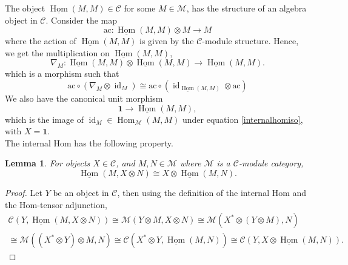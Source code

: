 \documentclass[a4paper, 10pt]{book}
\newtheorem{Lem}[theorem]{Lemma}
\theoremstyle{definition}
\numberwithin{equation}{chapter}
\newcommand\ac{\text{ac}}
\newcommand\id{\operatorname{id}}
\newcommand\ot{\otimes}
\newcommand\Hom{\operatorname{Hom}}
\newcommand\M{\mathcal{M}}
\newcommand\C{\mathcal C}
\newcommand\one{\mathbf{1}}
\begin{document}
The object $\underline{\Hom} (M, M)\in \C$ for some $M\in\M$, has the structure of an algebra object in $\C$. Consider the map \begin{equation}
	\ac: \underline{\Hom} (M, M) \otimes M \rightarrow M
\end{equation} where the action of $\underline{\Hom} (M, M)$ is given by the $\C$-module structure. Hence, we get the multiplication on $\underline{\Hom} (M, M)$,   \begin{equation}
\nabla_M:	\underline{\Hom} (M, M)\otimes \underline{\Hom} (M, M) \rightarrow \underline{\Hom} (M, M).
\end{equation} which is a morphism such that \begin{equation}
	\ac\circ (\nabla_M\ot \id_M) \cong \ac\circ (\id_{\underline{\Hom} (M, M)}\ot \ac)
\end{equation}  We also have the canonical unit morphism \begin{equation}
	\one\rightarrow \underline{\Hom}(M,M),                                                  
\end{equation}which is the image of $\id_M\in \Hom_\M(M, M)$ under equation \ref{internalhomiso}, with $X=\one$. 
\\
The internal Hom has the following property.
\begin{Lem}\label{internalhomlemma}
For objects $X\in \C$, and $ M, N\in \M$ where $\M$ is a $\C$-module category,
\begin{equation}
\underline{\Hom}(M, X\otimes N) \cong X \otimes \underline{\Hom}(M, N).
\end{equation}
\end{Lem}
\begin{proof}
Let $Y$ be an object in $\C$, then using the definition of the internal Hom and the Hom-tensor adjunction, \begin{align}
	\C(Y, \underline{\Hom}(M, X\ot N)) \cong \M(Y\ot M,  X\ot N) \cong \M(X^* \ot (Y\ot M),  N) \\
	\cong \M((X^* \ot Y)\ot M,  N) \cong \C(X^* \ot Y, \underline{\Hom}( M,  N)) \cong \C(Y, X\ot \underline{\Hom}(M,  N)).
\end{align} 
\end{proof}
\end{document}
